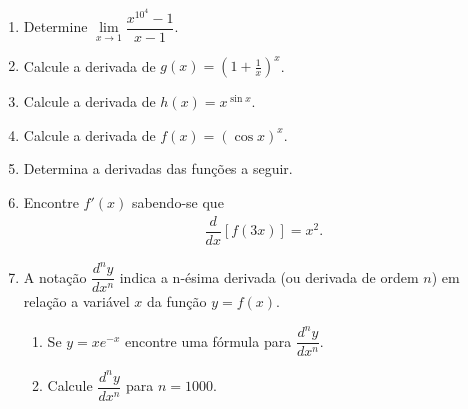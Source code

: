 \begin{enumerate}
     \item Determine $\lim\limits_{x\to 1}\dfrac{x^{10^4}-1}{x-1}$.
    
     \item Calcule a derivada de $g(x)=\left(1+ \frac{1}{x}\right)^x$.
     \item Calcule a derivada de $h(x)=x^{\sin{x}}$.
     \item Calcule a derivada de $f(x)=\left(\cos{x}\right)^x$.
    \item Determina a derivadas das funções a seguir.
        \begin{enumerate}
        \end{enumerate}
    
    \item Encontre $f'(x)$ sabendo-se que 
            \begin{align*}
                \dfrac{d}{dx}\left[f(3x)\right]=x^2.
            \end{align*}
    
    \item A notação $\dfrac{d^{n}y}{dx^n}$ indica a n-ésima derivada (ou derivada de ordem $n$) em relação a variável $x$ da função $y=f(x)$. 
    \begin{enumerate}
        \item Se $y=xe^{-x}$ encontre uma fórmula para $\dfrac{d^{n}y}{dx^n}$.
        \item Calcule $\dfrac{d^{n}y}{dx^n}$ para $n=1000$.
    \end{enumerate}
    

\end{enumerate}

